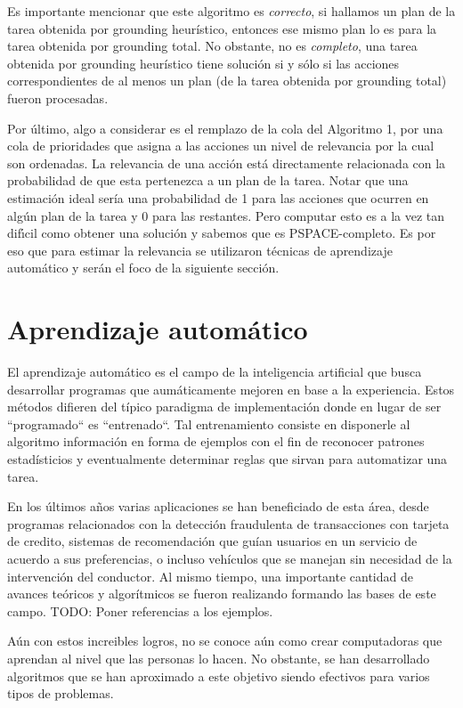 Es importante mencionar que este algoritmo es \emph{correcto}, si hallamos un
plan de la tarea obtenida por grounding heurístico, entonces ese mismo plan lo
es para la tarea obtenida por grounding total. No obstante, no es
\emph{completo}, una tarea obtenida por grounding heurístico tiene solución si y
sólo si las acciones correspondientes de al menos un plan (de la tarea obtenida
por grounding total) fueron procesadas.

Por último, algo a considerar es el remplazo de la cola del Algoritmo 1, por una
cola de prioridades que asigna a las acciones un nivel de relevancia por la cual
son ordenadas. La relevancia de una acción está directamente relacionada con la
probabilidad de que esta pertenezca a un plan de la tarea. Notar que una
estimación ideal sería una probabilidad de 1 para las acciones que ocurren en
algún plan de la tarea y 0 para las restantes. Pero computar esto es a la vez
tan difı́cil como obtener una solución y sabemos que es PSPACE-completo. Es por
eso que para estimar la relevancia se utilizaron técnicas de aprendizaje
automático y serán el foco de la siguiente sección.

\section{Aprendizaje automático}

El aprendizaje automático es el campo de la inteligencia artificial que busca
desarrollar programas que aumáticamente mejoren en base a la experiencia. Estos
métodos difieren del típico paradigma de implementación donde en lugar de ser
``programado`` es ``entrenado``. Tal entrenamiento consiste en disponerle al
algoritmo información en forma de ejemplos con el fin de reconocer patrones
estadísticios y eventualmente determinar reglas que sirvan para automatizar una
tarea.

En los últimos años varias aplicaciones se han beneficiado de esta área, desde
programas relacionados con la detección fraudulenta de transacciones con tarjeta
de credito, sistemas de recomendación que guían usuarios en un servicio de
acuerdo a sus preferencias, o incluso vehículos que se manejan sin necesidad de
la intervención del conductor. Al mismo tiempo, una importante cantidad de
avances teóricos y algorítmicos se fueron realizando formando las bases de este
campo. TODO: Poner referencias a los ejemplos.

Aún con estos increibles logros, no se conoce aún como crear computadoras que
aprendan al nivel que las personas lo hacen. No obstante, se han desarrollado
algoritmos que se han aproximado a este objetivo siendo efectivos para varios
tipos de problemas.

